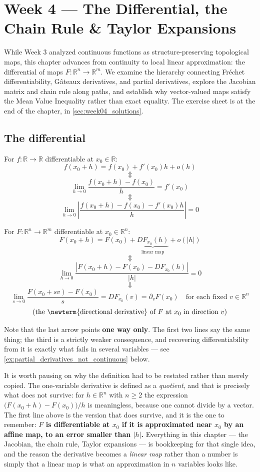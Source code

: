 \chapter{Week 4 --- The Differential, the Chain Rule \& Taylor Expansions}

While Week 3 analyzed continuous functions as structure-preserving topological maps, this chapter advances from continuity to local linear approximation: the differential of maps $F: \mathbb{R}^n \to \mathbb{R}^m$. We examine the hierarchy connecting Fréchet differentiability, Gâteaux derivatives, and partial derivatives, explore the Jacobian matrix and chain rule along paths, and establish why vector-valued maps satisfy the Mean Value Inequality rather than exact equality. The exercise sheet is at the end of the chapter, in \cref{sec:week04_solutions}.


\section{The differential}
\label{sec:the_differential}

For $f : \mathbb{R}\to\mathbb{R}$ differentiable at $x_0 \in \mathbb{R}$:
\[f(x_0+h) = f(x_0) + f'(x_0)h + o(h)\]
\[\Updownarrow\]
\[\lim_{h\to 0}\frac{f(x_0+h)-f(x_0)}{h} = f'(x_0)\]
\[\Updownarrow\]
\[\lim_{h\to 0}\left|\frac{f(x_0+h)-f(x_0)-f'(x_0)h}{h}\right| = 0\]

For $F : \mathbb{R}^n \to \mathbb{R}^m$ differentiable at $x_0 \in \mathbb{R}^n$:
\[F(x_0+h) = F(x_0) + \underbrace{DF_{x_0}(h)}_{\text{linear map}} + o(|h|)\]
\[\Updownarrow\]
\[\lim_{h\to 0}\frac{|F(x_0+h)-F(x_0)-DF_{x_0}(h)|}{|h|} = 0\]
\[\Downarrow\]
\[\lim_{s\to 0}\frac{F(x_0+sv)-F(x_0)}{s} = DF_{x_0}(v) = \partial_vF(x_0) \quad \text{for each fixed } v \in \mathbb{R}^n\]
\[\text{(the \newterm{directional derivative} of } F \text{ at } x_0 \text{ in direction } v\text{)}\]

Note that the last arrow points \textbf{one way only}. The first two lines say the same thing;
the third is a strictly weaker consequence, and recovering differentiability from it is exactly
what fails in several variables --- see \cref{ex:partial_derivatives_not_continuous} below.

It is worth pausing on why the definition had to be restated rather than merely copied. The
one-variable derivative is defined as a \emph{quotient}, and that is precisely what does not
survive: for $h \in \mathbb{R}^n$ with $n \geq 2$ the expression
$\big(F(x_0+h)-F(x_0)\big)/h$ is meaningless, because one cannot divide by a vector. The first
line above is the version that does survive, and it is the one to remember: \textbf{$F$ is
differentiable at $x_0$ if it is approximated near $x_0$ by an affine map, to an error smaller
than $|h|$.} Everything in this chapter --- the Jacobian, the chain rule, Taylor expansions ---
is bookkeeping for that single idea, and the reason the derivative becomes a \emph{linear map}
rather than a number is simply that a linear map is what an approximation in $n$ variables looks
like.

